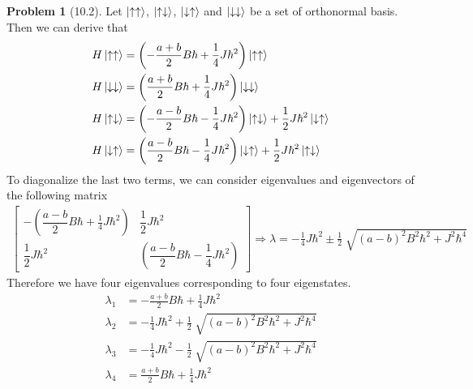 \documentclass[twoside,11pt]{article}
\theoremstyle{definition}
\newtheorem{problem}{Problem}
\theoremstyle{remark}
\begin{document}
\begin{problem}[10.2]
Let $\ket{\uparrow\uparrow}$, $\ket{\uparrow\downarrow}$,
$\ket{\downarrow\uparrow}$ and $\ket{\downarrow\downarrow}$ 
be a set of orthonormal basis.
Then we can derive that
\begin{align*}
    H\ket{\uparrow\uparrow} &= \left(
        -\frac{a+b}{2}B\hbar + \frac{1}{4}J\hbar^2
    \right)\ket{\uparrow\uparrow}\\
    H\ket{\downarrow\downarrow} &= 
    \left(
        \frac{a+b}{2}B\hbar+\frac{1}{4}J\hbar^2
    \right)\ket{\downarrow\downarrow}\\
    H\ket{\uparrow\downarrow} &=
    \left(
        -\frac{a-b}{2}B\hbar-\frac{1}{4}J\hbar^2
    \right)\ket{\uparrow\downarrow}
    + \frac{1}{2}J\hbar^2\ket{\downarrow\uparrow}\\
    H\ket{\downarrow\uparrow} &=
    \left(
        \frac{a-b}{2}B\hbar-\frac{1}{4}J\hbar^2
    \right)\ket{\downarrow\uparrow}
    + \frac{1}{2}J\hbar^2\ket{\uparrow\downarrow}
\end{align*}
To diagonalize the last two terms, we can consider eigenvalues and
eigenvectors of the following matrix
\begin{align*}
    \begin{bmatrix}
        -\left(\dfrac{a-b}{2}B\hbar+\frac{1}{4}J\hbar^2\right) & 
        \dfrac{1}{2}J\hbar^2\\[1em]
        \dfrac{1}{2}J\hbar^2 & 
        \left(\dfrac{a-b}{2}B\hbar-\dfrac{1}{4}J\hbar^2\right)
    \end{bmatrix}
    \Rightarrow
    \lambda=-\frac{1}{4}J\hbar^2\pm\frac{1}{2}\sqrt[]{(a-b)^2B^2\hbar^2+J^2\hbar^4}
\end{align*}
Therefore we have four eigenvalues corresponding to four eigenstates.
\begin{align*}
    \lambda_1 &= -\frac{a+b}{2}B\hbar + \frac{1}{4}J\hbar^2\\
    \lambda_2 &= -\frac{1}{4}J\hbar^2 + \frac{1}{2}\sqrt[]{(a-b)^2B^2\hbar^2+J^2\hbar^4}\\
    \lambda_3 &= -\frac{1}{4}J\hbar^2 - \frac{1}{2}\sqrt[]{(a-b)^2B^2\hbar^2+J^2\hbar^4}\\
    \lambda_4 &= \frac{a+b}{2}B\hbar + \frac{1}{4}J\hbar^2
\end{align*}

\end{problem}
\end{document}

